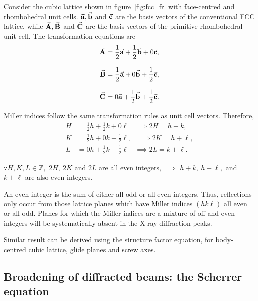 	Consider the cubic lattice shown in figure~\ref{fig:fcc_fr} with face-centred and rhombohedral unit cells. $\va{a}, \va{b}$ and $\va{c}$ are the basis vectors of the conventional FCC lattice, while $\va{A}, \va{B}$ and $\va{C}$ are the basis vectors of the primitive rhombohedral unit cell. The transformation equations are%
%		
	\begin{subequations}%
		\begin{align}
		\va{A} &= \frac{1}{2}\va{a} + \frac{1}{2}\va{b} + 0\va{c},\\[0.8em]
		\va{B} &= \frac{1}{2}\va{a} + 0\va{b} + \frac{1}{2}\va{c},\\[0.8em]
		\va{C} &= 0\va{a} + \frac{1}{2}\va{b} + \frac{1}{2}\va{c}.
		\end{align}
	\end{subequations}
	
	Miller indices follow the same transformation rules as unit cell vectors. Therefore,%
%	
	\begin{subequations}%
		\begin{align}
		H &= \frac{1}{2}h + \frac{1}{2}k + 0\ell \quad \implies 2H = h + k,\\[0.8em]
		K &= \frac{1}{2}h + 0k + \frac{1}{2}\ell, \quad \implies 2K = h + \ell,\\[0.8em]
		L &= 0h + \frac{1}{2}k + \frac{1}{2}\ell \quad \implies 2L = k + \ell.
		\end{align}
	\end{subequations}
	
	$\because H,K,L \in \mathbb{Z},$  $2H,\ 2K$ and $2L$ are all even integers, $\implies$ $h + k,\ h + \ell,$ and $k + \ell$ are also even integers.
	
	An even integer is the sum of either all odd or all even integers. Thus, reflections only occur from those lattice planes which have Miller indices $(hk\ell)$ all even or all odd. Planes for which the Miller indices are a mixture of off and even integers will be systematically absent in the X-ray diffraction peaks.
	
	Similar result can be derived using the structure factor equation, for body-centred cubic lattice, glide planes and screw axes.
	

\subsection{Broadening of diffracted beams: the Scherrer equation}
	
